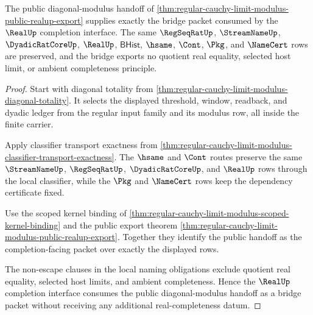 \begin{theorem}
\label{thm:regular-cauchy-limit-modulus-realup-completion-bridge}
The public diagonal-modulus handoff of \autoref{thm:regular-cauchy-limit-modulus-public-realup-export} supplies exactly the bridge packet consumed by the $\RealUp$ completion interface. The same $\RegSeqRatUp$, $\StreamNameUp$, $\DyadicRatCoreUp$, $\RealUp$, $\mathsf{BHist}$, $\hsame$, $\Cont$, $\Pkg$, and $\NameCert$ rows are preserved, and the bridge exports no quotient real equality, selected host limit, or ambient completeness principle.
\end{theorem}
\begin{proof}
Start with diagonal totality from \autoref{thm:regular-cauchy-limit-modulus-diagonal-totality}. It selects the displayed threshold, window, readback, and dyadic ledger from the regular input family and its modulus row, all inside the finite carrier.

Apply classifier transport exactness from \autoref{thm:regular-cauchy-limit-modulus-classifier-transport-exactness}. The $\hsame$ and $\Cont$ routes preserve the same $\StreamNameUp$, $\RegSeqRatUp$, $\DyadicRatCoreUp$, and $\RealUp$ rows through the local classifier, while the $\Pkg$ and $\NameCert$ rows keep the dependency certificate fixed.

Use the scoped kernel binding of \autoref{thm:regular-cauchy-limit-modulus-scoped-kernel-binding} and the public export theorem \autoref{thm:regular-cauchy-limit-modulus-public-realup-export}. Together they identify the public handoff as the completion-facing packet over exactly the displayed rows.

The non-escape clauses in the local naming obligations exclude quotient real equality, selected host limits, and ambient completeness. Hence the $\RealUp$ completion interface consumes the public diagonal-modulus handoff as a bridge packet without receiving any additional real-completeness datum.
\end{proof}

